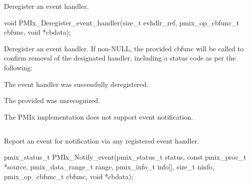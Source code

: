 \summary

Deregister an event handler.

\format

\cspecificstart
\begin{codepar}
void
PMIx_Deregister_event_handler(size_t evhdlr_ref,
                              pmix_op_cbfunc_t cbfunc,
                              void *cbdata);
\end{codepar}
\cspecificend

\begin{arglist}
\end{arglist}

\descr

Deregister an event handler. If non-NULL, the provided cbfunc will be called to confirm removal of the designated handler, including a status code as per the following:

\begin{constantdesc}
\item {} The event handler was successfully deregistered.
\item {} The provided  was unrecognized.
\item {} The \ac{PMIx} implementation does not support event notification.
\end{constantdesc}


\subsection{}

\summary

Report an event for notification via any
registered event handler.

\format

\cspecificstart
\begin{codepar}
pmix_status_t
PMIx_Notify_event(pmix_status_t status,
                  const pmix_proc_t *source,
                  pmix_data_range_t range,
                  pmix_info_t info[], size_t ninfo,
                  pmix_op_cbfunc_t cbfunc, void *cbdata);
\end{codepar}
\cspecificend

